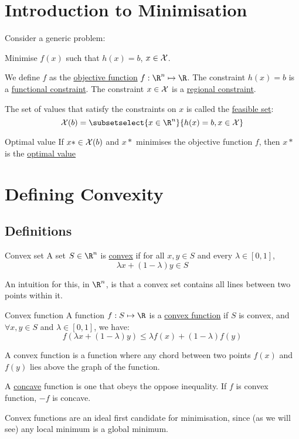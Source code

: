 \documentclass[../Main.tex]{subfiles}
\begin{document}
\section{Introduction to Minimisation} %
Consider a generic problem:

Minimise $f(x)$ such that $h(x) = b$, $x \in \mathcal{X}$.

We define $f$ as the \underline{objective function} $f : \R^n \mapsto \R$. The constraint $h(x) = b$ is a \underline{functional constraint}. The constraint $x \in \mathcal{X}$ is a \underline{regional constraint}.

The set of values that satisfy the constraints on $x$ is called the \underline{feasible set}:
\begin{equation}
    \Xset(b) = \subsetselect{x \in \R^n}{h(x) = b, x \in \Xset}
    \label{eqnFeasibleSet}
\end{equation}
\begin{definition}{Optimal value}
    If $x* \in \mathcal{X}(b)$ and $x*$ minimises the objective function $f$, then $x*$ is the \underline{optimal value}
\end{definition}
\section{Defining Convexity}
\subsection{Definitions}
\begin{definition}{Convex set}
    A set $S \in \R^n$ is \underline{convex} if for all $x, y \in S$ and every $\lambda \in [0, 1]$,
    \begin{equation*}
        \lambda x + (1 - \lambda) y \in S
    \end{equation*}
\end{definition}
\begin{remark}
    An intuition for this, in $\R^n$, is that a convex set contains all lines between two points within it.
\end{remark}
\begin{definition}{Convex function}
    A function $f : S \mapsto \R$ is a \underline{convex function} if $S$ is convex, and $\forall x, y \in S$ and $\lambda \in [0, 1]$, we have:
    \begin{equation*}
        f(\lambda x + (1-\lambda)y) \leq \lambda f(x) + (1 - \lambda) f(y)
    \end{equation*}
\end{definition}
\begin{remarks}
    \item A convex function is a function where any chord between two points $f(x)$ and $f(y)$ lies above the graph of the function.
    \item A \underline{concave} function is one that obeys the oppose inequality. If $f$ is convex function, $-f$ is concave.
    \item Convex functions are an ideal first candidate for minimisation, since (as we will see) any local minimum is a global minimum.
\end{remarks}
\end{document}

